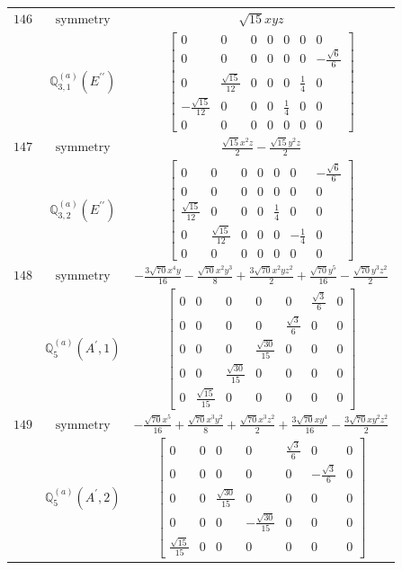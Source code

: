 \documentclass[fleqn,8pt,landscape]{jsarticle}
\begin{document}
\begin{longtable}{ccc}
$ 146 $ & $ \text{symmetry} $ & $ \sqrt{15} x y z $ \\
$  $ & $ \mathbb{Q}_{3,1}^{(a)}(E^{\prime\prime}) $ & $ \begin{bmatrix} 0 & 0 & 0 & 0 & 0 & 0 & 0 \\ 0 & 0 & 0 & 0 & 0 & 0 & - \frac{\sqrt{6}}{6} \\ 0 & \frac{\sqrt{15}}{12} & 0 & 0 & 0 & \frac{1}{4} & 0 \\ - \frac{\sqrt{15}}{12} & 0 & 0 & 0 & \frac{1}{4} & 0 & 0 \\ 0 & 0 & 0 & 0 & 0 & 0 & 0 \end{bmatrix} $ \\ \hline
$ 147 $ & $ \text{symmetry} $ & $ \frac{\sqrt{15} x^{2} z}{2} - \frac{\sqrt{15} y^{2} z}{2} $ \\
$  $ & $ \mathbb{Q}_{3,2}^{(a)}(E^{\prime\prime}) $ & $ \begin{bmatrix} 0 & 0 & 0 & 0 & 0 & 0 & - \frac{\sqrt{6}}{6} \\ 0 & 0 & 0 & 0 & 0 & 0 & 0 \\ \frac{\sqrt{15}}{12} & 0 & 0 & 0 & \frac{1}{4} & 0 & 0 \\ 0 & \frac{\sqrt{15}}{12} & 0 & 0 & 0 & - \frac{1}{4} & 0 \\ 0 & 0 & 0 & 0 & 0 & 0 & 0 \end{bmatrix} $ \\ \hline
$ 148 $ & $ \text{symmetry} $ & $ - \frac{3 \sqrt{70} x^{4} y}{16} - \frac{\sqrt{70} x^{2} y^{3}}{8} + \frac{3 \sqrt{70} x^{2} y z^{2}}{2} + \frac{\sqrt{70} y^{5}}{16} - \frac{\sqrt{70} y^{3} z^{2}}{2} $ \\
$  $ & $ \mathbb{Q}_{5}^{(a)}(A^{\prime},1) $ & $ \begin{bmatrix} 0 & 0 & 0 & 0 & 0 & \frac{\sqrt{3}}{6} & 0 \\ 0 & 0 & 0 & 0 & \frac{\sqrt{3}}{6} & 0 & 0 \\ 0 & 0 & 0 & \frac{\sqrt{30}}{15} & 0 & 0 & 0 \\ 0 & 0 & \frac{\sqrt{30}}{15} & 0 & 0 & 0 & 0 \\ 0 & \frac{\sqrt{15}}{15} & 0 & 0 & 0 & 0 & 0 \end{bmatrix} $ \\ \hline
$ 149 $ & $ \text{symmetry} $ & $ - \frac{\sqrt{70} x^{5}}{16} + \frac{\sqrt{70} x^{3} y^{2}}{8} + \frac{\sqrt{70} x^{3} z^{2}}{2} + \frac{3 \sqrt{70} x y^{4}}{16} - \frac{3 \sqrt{70} x y^{2} z^{2}}{2} $ \\
$  $ & $ \mathbb{Q}_{5}^{(a)}(A^{\prime},2) $ & $ \begin{bmatrix} 0 & 0 & 0 & 0 & \frac{\sqrt{3}}{6} & 0 & 0 \\ 0 & 0 & 0 & 0 & 0 & - \frac{\sqrt{3}}{6} & 0 \\ 0 & 0 & \frac{\sqrt{30}}{15} & 0 & 0 & 0 & 0 \\ 0 & 0 & 0 & - \frac{\sqrt{30}}{15} & 0 & 0 & 0 \\ \frac{\sqrt{15}}{15} & 0 & 0 & 0 & 0 & 0 & 0 \end{bmatrix} $ \\ \hline

\end{longtable}
\end{document}
